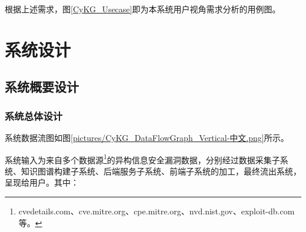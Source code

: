 \documentclass[a4paper,AutoFakeBold,oneside,12pt]{book}
\begin{document}
根据上述需求，图\ref{CyKG_Usecase}即为本系统用户视角需求分析的用例图。


\chapter{系统设计}

\section{系统概要设计}

\subsection{系统总体设计}

系统数据流图如图\ref{pictures/CyKG_DataFlowGraph_Vertical-中文.png}所示。


系统输入为来自多个数据源\footnote{cvedetails.com、cve.mitre.org、cpe.mitre.org、nvd.nist.gov、exploit-db.com 等。}的异构信息安全漏洞数据，分别经过数据采集子系统、知识图谱构建子系统、后端服务子系统、前端子系统的加工，最终流出系统，呈现给用户。其中：
\end{document}
